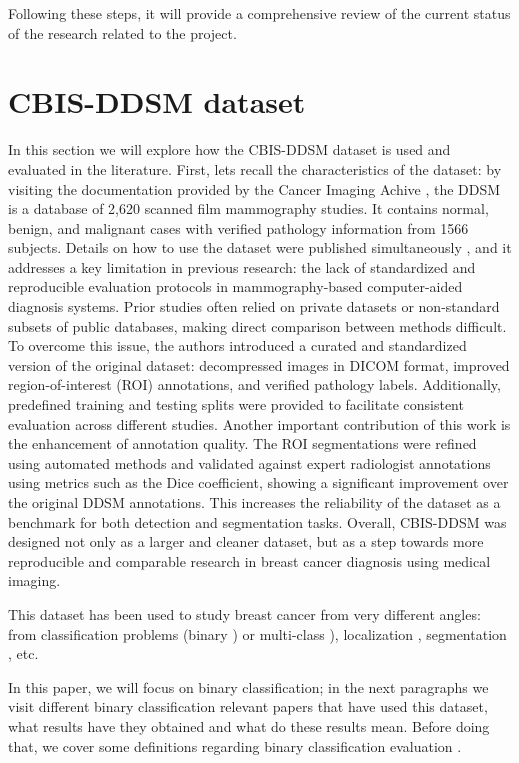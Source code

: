 \documentclass[ENG]{TFUOC}%
\begin{document}
Following these steps, it will provide a comprehensive review of the current status of the research related to the project.

\section{CBIS-DDSM dataset}\label{CBIS-DDSM}

In this section we will explore how the CBIS-DDSM dataset is used and evaluated in the literature. First, lets recall the characteristics of the dataset: by visiting the documentation provided by the Cancer Imaging Achive \cite{cbis_ddsm_dataset}, the DDSM is a database of 2,620 scanned film mammography studies. It contains normal, benign, and malignant cases with verified pathology information from 1566 subjects. Details on how to use the dataset were published simultaneously \cite{how_to_CBIS-DDSM}, and it addresses a key limitation in previous research: the lack of standardized and reproducible evaluation protocols in mammography-based computer-aided diagnosis systems. Prior studies often relied on private datasets or non-standard subsets of public databases, making direct comparison between methods difficult. To overcome this issue, the authors introduced a curated and standardized version of the original dataset: decompressed images in DICOM format, improved region-of-interest (ROI) annotations, and verified pathology labels. Additionally, predefined training and testing splits were provided to facilitate consistent evaluation across different studies. Another important contribution of this work is the enhancement of annotation quality. The ROI segmentations were refined using automated methods and validated against expert radiologist annotations using metrics such as the Dice coefficient, showing a significant improvement over the original DDSM annotations. This increases the reliability of the dataset as a benchmark for both detection and segmentation tasks. Overall, CBIS-DDSM was designed not only as a larger and cleaner dataset, but as a step towards more reproducible and comparable research in breast cancer diagnosis using medical imaging.

This dataset has been used to study breast cancer from very different angles: from classification problems (binary \cite{binary_CBIS-DDSM_1}) or multi-class \cite{multi_class_CBIS-DDSM}), localization \cite{localization_CBIS-DDSM}, segmentation \cite{segmentation_CBIS-DDSM}, etc. 

In this paper, we will focus on binary classification; in the next paragraphs we visit different binary classification relevant papers that have used this dataset, what results have they obtained and what do these results mean. Before doing that, we cover some definitions regarding binary classification evaluation  \cite{binary_CBIS-DDSM_1}.
\end{document}
